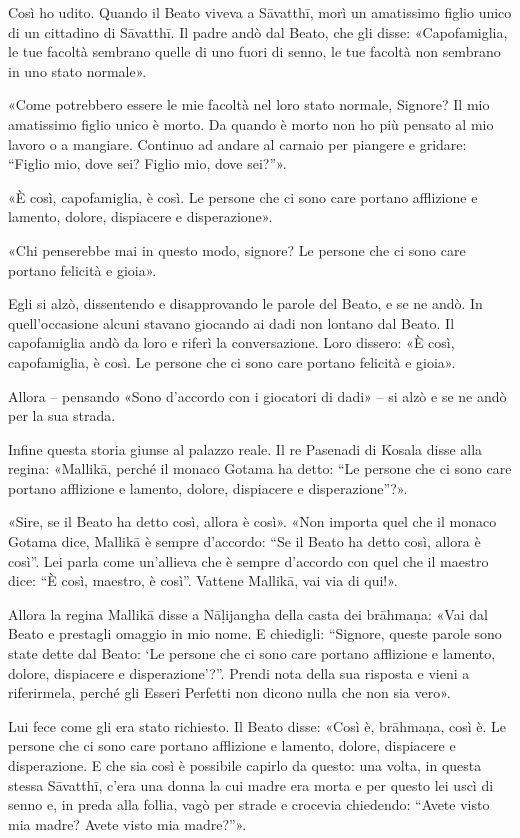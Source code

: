  Così ho udito. Quando il Beato viveva a Sāvatthī, morì un
amatissimo figlio unico di un cittadino di Sāvatthī. Il padre andò dal
Beato, che gli disse: «Capofamiglia, le tue facoltà sembrano quelle di
uno fuori di senno, le tue facoltà non sembrano in uno stato normale».


«Come potrebbero essere le mie facoltà nel loro stato normale, Signore?
Il mio amatissimo figlio unico è morto. Da quando è morto non ho più
pensato al mio lavoro o a mangiare. Continuo ad andare al carnaio per
piangere e gridare: “Figlio mio, dove sei? Figlio mio, dove sei?”».


«È così, capofamiglia, è così. Le persone che ci sono care portano
afflizione e lamento, dolore, dispiacere e disperazione».


«Chi penserebbe mai in questo modo, signore? Le persone che ci sono care
portano felicità e gioia».


Egli si alzò, dissentendo e disapprovando le parole del Beato, e se ne
andò. In quell’occasione alcuni stavano giocando ai dadi non lontano dal
Beato. Il capofamiglia andò da loro e riferì la conversazione. Loro
dissero: «È così, capofamiglia, è così. Le persone che ci sono care
portano felicità e gioia».


Allora – pensando «Sono d’accordo con i giocatori di dadi» – si alzò e
se ne andò per la sua strada.


Infine questa storia giunse al palazzo reale. Il re Pasenadi di Kosala
disse alla regina: «Mallikā, perché il monaco Gotama ha detto: “Le
persone che ci sono care portano afflizione e lamento, dolore,
dispiacere e disperazione”?».


«Sire, se il Beato ha detto così, allora è così». «Non importa quel che
il monaco Gotama dice, Mallikā è sempre d’accordo: “Se il Beato ha detto
così, allora è così”. Lei parla come un’allieva che è sempre d’accordo
con quel che il maestro dice: “È così, maestro, è così”. Vattene
Mallikā, vai via di qui!».


Allora la regina Mallikā disse a Nāḷijangha della casta dei brāhmaṇa:
«Vai dal Beato e prestagli omaggio in mio nome. E chiedigli: “Signore,
queste parole sono state dette dal Beato: ‘Le persone che ci sono care
portano afflizione e lamento, dolore, dispiacere e disperazione’?”.
Prendi nota della sua risposta e vieni a riferirmela, perché gli Esseri
Perfetti non dicono nulla che non sia vero».


Lui fece come gli era stato richiesto. Il Beato disse: «Così è,
brāhmaṇa, così è. Le persone che ci sono care portano afflizione e
lamento, dolore, dispiacere e disperazione. E che sia così è possibile
capirlo da questo: una volta, in questa stessa Sāvatthī, c’era una donna
la cui madre era morta e per questo lei uscì di senno e, in preda alla
follia, vagò per strade e crocevia chiedendo: “Avete visto mia madre?
Avete visto mia madre?”».


